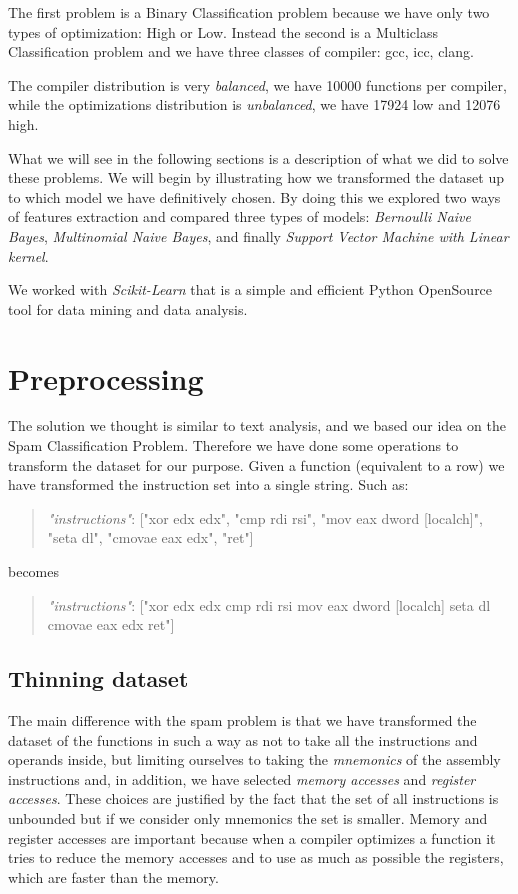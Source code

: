 \documentclass[12pt]{article}
\begin{document}
The first problem is a Binary Classification problem because we have only two types of optimization: High or Low.
Instead the second is a Multiclass Classification problem and we have three classes of compiler: gcc, icc, clang.

The compiler distribution is very {\em balanced}, we have 10000 functions per compiler, while the optimizations distribution
is {\em unbalanced}, we have 17924 low and 12076 high.

What we will see in the following sections is a description of what we did to solve these problems.
We will begin by illustrating how we transformed the dataset up to which model we have definitively chosen. By doing this we explored two ways of features extraction and compared three types of models:
{\em Bernoulli Naive Bayes},
{\em Multinomial Naive Bayes},
and finally {\em Support Vector Machine with Linear kernel}.

We worked with {\em Scikit-Learn} that is a simple and efficient Python OpenSource tool for data mining and data analysis.

\section{Preprocessing}
The solution we thought is similar to text analysis, and we based our idea on the Spam Classification Problem.
Therefore we have done some operations to transform the dataset for our purpose. Given a function (equivalent to a row) we have transformed the instruction set into a single string. Such as:
\begin{quote}
{\em "instructions"}: ["xor edx edx", "cmp rdi rsi", "mov eax dword [localch]", "seta dl", "cmovae eax edx", "ret"]
\end{quote}
\centerline{becomes}
\begin{quote}
{\em "instructions"}: ["xor edx edx cmp rdi rsi mov eax dword [localch] seta dl cmovae eax edx ret"]
\end{quote}


\subsection{Thinning dataset}
The main difference with the spam problem is that we have transformed the dataset of the functions in such a way as not to take all the instructions and operands inside, but limiting ourselves to taking the {\em mnemonics} of the assembly instructions and, in addition, we have selected {\em memory accesses} and {\em register accesses}. These choices are justified by the fact that the set of all instructions is unbounded but if we consider only mnemonics the set is smaller. Memory and register accesses are important because when a compiler optimizes a function it tries to reduce the memory accesses and to use as much as possible the registers, which are faster than the memory.
\end{document}
